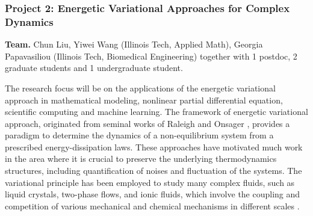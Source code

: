 \documentclass[11pt]{NSFamsart}
\begin{document}
\subsubsection*{Project 2: Energetic Variational Approaches for Complex Dynamics}
\noindent
{\bf Team.} Chun Liu, Yiwei Wang (Illinois Tech, Applied Math), Georgia Papavasiliou (Illinois Tech, Biomedical Engineering) together with 1 postdoc, 2 graduate students and 1 undergraduate student.

\medskip


 The research focus will be on the applications of the energetic variational approach in mathematical modeling, nonlinear partial differential equation, scientific computing and machine learning. The framework of energetic variational approach, originated from seminal works of Raleigh \cite{strutt1871some} and Onsager \cite{onsager1931reciprocal,onsager1931reciprocal2}, provides a paradigm to determine the dynamics of a non-equilibrium system from a prescribed energy-dissipation laws.
These approaches have motivated much work in the area where it is crucial to preserve the underlying
thermodynamics structures, including quantification of noises and fluctuation of the systems.
 The variational principle has been employed to study many complex fluids, such as liquid crystals,
 two-phase flows, and ionic fluids, which involve the coupling and competition of various mechanical and chemical mechanisms in different scales \cite{lin2001static, feng2005energetic, LiLiZh05, Lin2007, liu2009introduction, du2009energetic, sun2009energetic, eisenberg2010energy, Giga2017, Liu2019, knopf2020phase}.
\end{document}
